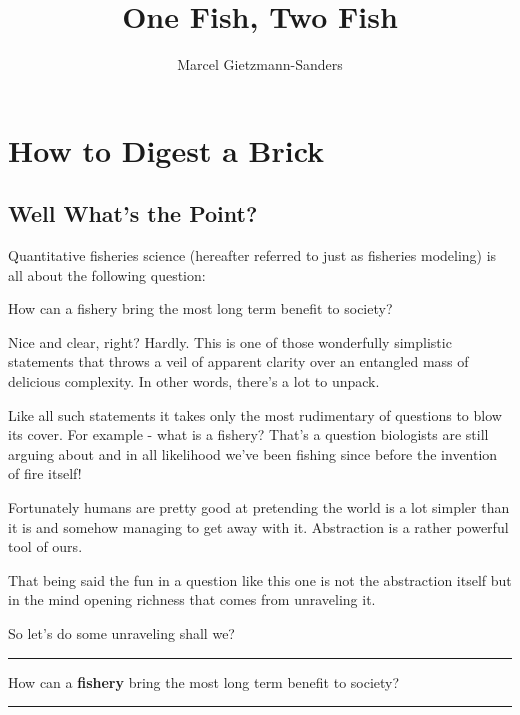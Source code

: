 \documentclass[11pt,a5paper]{book}
\title{One Fish, Two Fish}
\author{Marcel Gietzmann-Sanders}
\date{}
\begin{document}
\maketitle
\tableofcontents
\newpage
\chapter{How to Digest a Brick}

\section{Well What's the Point?}

Quantitative fisheries science (hereafter referred to just as fisheries modeling) is all about the following question:
\newline

 \hangindent=1cm \noindent How can a fishery bring the most long term benefit to society?
\newline

Nice and clear, right? Hardly. This is one of those wonderfully simplistic statements that throws a veil of apparent clarity over an entangled mass of delicious complexity. In other words, there's a lot to unpack.
\newline

Like all such statements it takes only the most rudimentary of questions to blow its cover. For example - what is a fishery? That's a question biologists are still arguing about and in all likelihood we've been fishing since before the invention of fire itself! 
\newline

Fortunately humans are pretty good at pretending the world is a lot simpler than it is and somehow managing to get away with it. Abstraction is a rather powerful tool of ours.
\newline

That being said the fun in a question like this one is not the abstraction itself but in the mind opening richness that comes from unraveling it.
\newline

So let's do some unraveling shall we? 
\newpage

\noindent \rule{\textwidth}{0.5pt} 
\noindent How can a \textbf{fishery} bring the most long term benefit to society?
\newline
\rule{\textwidth}{0.5pt} 
\vspace{5pt}
\end{document}
